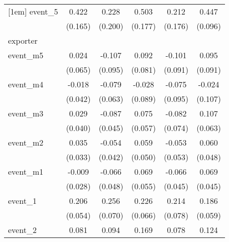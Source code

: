 {\begin{tabular}{l*{5}{c}}
[1em]
event\_5     &       0.422\sym{*}  &       0.228         &       0.503\sym{**} &       0.212         &       0.447\sym{***}\\
            &     (0.165)         &     (0.200)         &     (0.177)         &     (0.176)         &     (0.096)         \\
\hline
exporter    &                     &                     &                     &                     &                     \\
event\_m5    &       0.024         &      -0.107         &       0.092         &      -0.101         &       0.095         \\
            &     (0.065)         &     (0.095)         &     (0.081)         &     (0.091)         &     (0.091)         \\
[1em]
event\_m4    &      -0.018         &      -0.079         &      -0.028         &      -0.075         &      -0.024         \\
            &     (0.042)         &     (0.063)         &     (0.089)         &     (0.095)         &     (0.107)         \\
[1em]
event\_m3    &       0.029         &      -0.087         &       0.075         &      -0.082         &       0.107         \\
            &     (0.040)         &     (0.045)         &     (0.057)         &     (0.074)         &     (0.063)         \\
[1em]
event\_m2    &       0.035         &      -0.054         &       0.059         &      -0.053         &       0.060         \\
            &     (0.033)         &     (0.042)         &     (0.050)         &     (0.053)         &     (0.048)         \\
[1em]
event\_m1    &      -0.009         &      -0.066         &       0.069         &      -0.066         &       0.069         \\
            &     (0.028)         &     (0.048)         &     (0.055)         &     (0.045)         &     (0.045)         \\
[1em]
event\_1     &       0.206\sym{***}&       0.256\sym{***}&       0.226\sym{***}&       0.214\sym{**} &       0.186\sym{**} \\
            &     (0.054)         &     (0.070)         &     (0.066)         &     (0.078)         &     (0.059)         \\
[1em]
event\_2     &       0.081         &       0.094         &       0.169\sym{**} &       0.078         &       0.124\sym{*}  \\

\end{tabular}}
